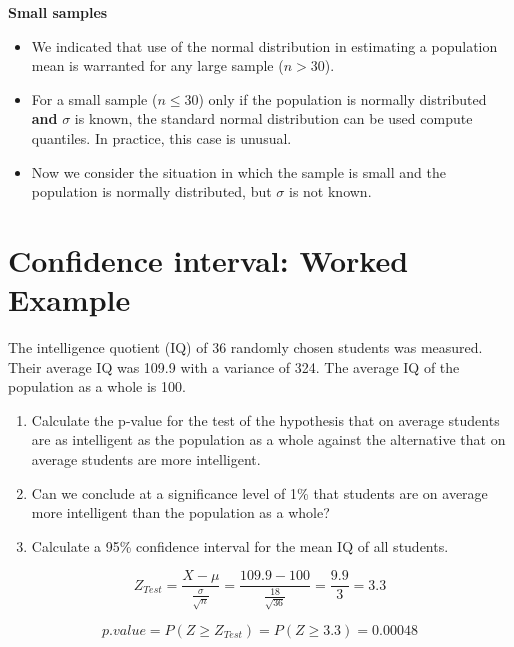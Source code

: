 \documentclass[]{report}
\begin{document}
\noindent \textbf{Small samples}
\begin{itemize} \item We indicated that use of the normal distribution in estimating a population mean is warranted
for any large sample ($n > 30$). \item For a small sample ($n \leq 30$) only if the population is normally distributed
\textbf{and} $\sigma$ is known, the standard normal distribution can be used compute quantiles. In practice,
this case is unusual.
\item Now we consider the situation in which the sample is small and the population is normally distributed,
but $\sigma$ is not known.
\end{itemize}



\section{Confidence interval: Worked Example}
The intelligence quotient (IQ) of 36 randomly chosen students was measured.
Their average IQ was 109.9 with a variance of 324.
The average IQ of the population as a whole is 100.

\begin{enumerate}
\item Calculate the p-value for the test of the hypothesis that on average
students are as intelligent as the population as a whole against the alternative that on average students are more intelligent.


\item Can we conclude at a significance level of 1\% that students are on average more intelligent than the population as a whole?

\item Calculate a 95\% confidence interval for the mean IQ of all students.

\end{enumerate}

\begin{equation}
Z_{Test} = \frac{X- \mu}{\frac{\sigma}{\sqrt{n}}} = \frac{109.9 - 100}{\frac{18}{\sqrt{36}}} = \frac{9.9}{3} = 3.3
\end{equation}


\begin{equation}
p.value = P(Z \geq Z_{Test}) = P(Z \geq 3.3) = 0.00048
\end{equation}
\end{document}
